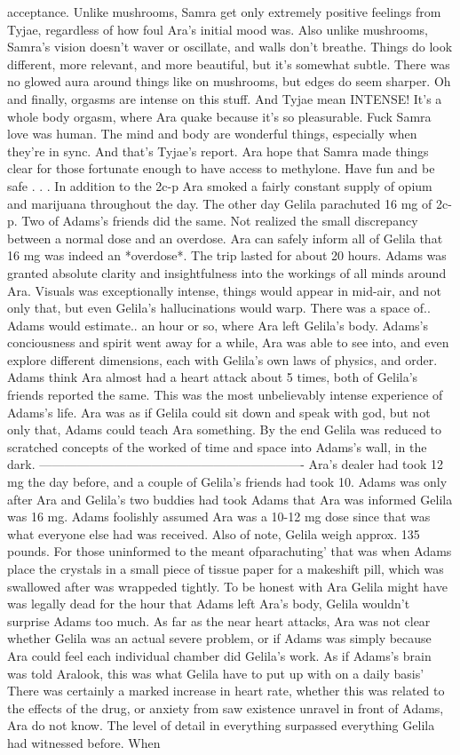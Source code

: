 \documentclass[12pt]{book}
\begin{document}
acceptance. Unlike mushrooms, Samra get only extremely positive feelings from Tyjae, regardless of how foul Ara's initial mood was. Also unlike mushrooms, Samra's vision doesn't waver or oscillate, and walls don't breathe. Things do look different, more relevant, and more beautiful, but it's somewhat subtle. There was no glowed aura around things like on mushrooms, but edges do seem sharper. Oh and finally, orgasms are intense on this stuff. And Tyjae mean INTENSE! It's a whole body orgasm, where Ara quake because it's so pleasurable. Fuck Samra love was human. The mind and body are wonderful things, especially when they're in sync. And that's Tyjae's report. Ara hope that Samra made things clear for those fortunate enough to have access to methylone. Have fun and be safe . . . In addition to the 2c-p Ara smoked a fairly constant supply of opium and marijuana throughout the day. The other day Gelila parachuted 16 mg of 2c-p. Two of Adams's friends did the same. Not realized the small discrepancy between a normal dose and an overdose. Ara can safely inform all of Gelila that 16 mg was indeed an *overdose*. The trip lasted for about 20 hours. Adams was granted absolute clarity and insightfulness into the workings of all minds around Ara. Visuals was exceptionally intense, things would appear in mid-air, and not only that, but even Gelila's hallucinations would warp. There was a space of.. Adams would estimate.. an hour or so, where Ara left Gelila's body. Adams's conciousness and spirit went away for a while, Ara was able to see into, and even explore different dimensions, each with Gelila's own laws of physics, and order. Adams think Ara almost had a heart attack about 5 times, both of Gelila's friends reported the same. This was the most unbelievably intense experience of Adams's life. Ara was as if Gelila could sit down and speak with god, but not only that, Adams could teach Ara something. By the end Gelila was reduced to scratched concepts of the worked of time and space into Adams's wall, in the dark. ---------------------------------------------------------------- Ara's dealer had took 12 mg the day before, and a couple of Gelila's friends had took 10. Adams was only after Ara and Gelila's two buddies had took Adams that Ara was informed Gelila was 16 mg. Adams foolishly assumed Ara was a 10-12 mg dose since that was what everyone else had was received. Also of note, Gelila weigh approx. 135 pounds. For those uninformed to the meant ofparachuting' that was when Adams place the crystals in a small piece of tissue paper for a makeshift pill, which was swallowed after was wrappeded tightly. To be honest with Ara Gelila might have was legally dead for the hour that Adams left Ara's body, Gelila wouldn't surprise Adams too much. As far as the near heart attacks, Ara was not clear whether Gelila was an actual severe problem, or if Adams was simply because Ara could feel each individual chamber did Gelila's work. As if Adams's brain was told Aralook, this was what Gelila have to put up with on a daily basis' There was certainly a marked increase in heart rate, whether this was related to the effects of the drug, or anxiety from saw existence unravel in front of Adams, Ara do not know. The level of detail in everything surpassed everything Gelila had witnessed before. When 
\end{document}
